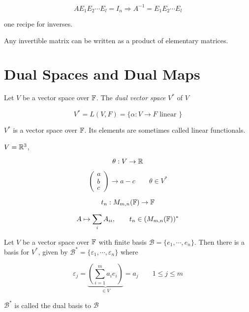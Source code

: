 \documentclass[a4paper]{article}
\begin{document}
\[ A E_{1} E_{2} \cdots E_{l} = I_{n} \Rightarrow A^{-1} = E_{1} E_{2} \cdots E_{l} \]

one recipe for inverses.

\begin{prop} 
	Any invertible matrix can be written as a product of elementary matrices.
\end{prop}


\section{Dual Spaces and Dual Maps}

\begin{defi}
	Let $ V $ be a vector space over $ \mathbb{F} $. The \emph{dual vector space} $ V^{*} $ of $ V $
	
	\[ V^{*} = L(V,F) = \{ \alpha : V \to F \text{ linear } \}  \]
\end{defi}

$ V^{*} $ is a vector space over $ \mathbb{F} $. Its elements are sometimes called linear functionals. 

\begin{eg}
	$ V = \mathbb{R}^{3} $,
	
	\[ \theta: V \to \mathbb{R} \]
	
	\[ \begin{pmatrix}
	a \\
	b\\
	c
	\end{pmatrix} \to a - c \qquad \theta \in V^{*} \]
\end{eg}

\begin{eg}
	\[ t_{n}:  M_{m,n}(\mathbb{F}) \to \mathbb{F} \]
	
	\[ A \mapsto \sum_{i} A_{ii}, \qquad t_{n} \in (M_{m,n}(\mathbb{F}))^{*} \]
\end{eg}

\begin{lemma} 
	Let $ V $ be a vector space over $ \mathbb{F} $ with finite basis $ \mathcal{B} = \{ e_{1},\cdots,e_{n} \} $. Then there is a basis for $ V^{*} $, given by $ \mathcal{B}^{*} = \{  \varepsilon_{1},\cdots,\varepsilon_{n} \}  $ where 
	
	\[ \varepsilon_{j} = \underbrace{\left(   \sum_{i=1}^{m}  a_{i} e_{i}  \right) }_{\in V} = a_{j}  \qquad 1 \leq j \leq m \]
	
	$ \mathcal{B}^{*} $ is called the dual basis to $ \mathcal{B} $
\end{lemma}
\end{document}
